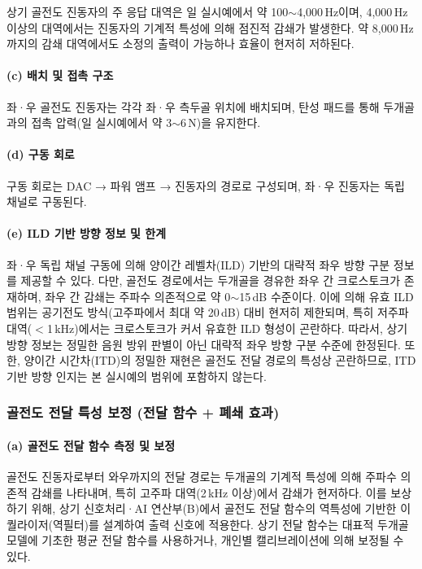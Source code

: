 \documentclass{article}
\begin{document}
상기 골전도 진동자의 주 응답 대역은 일 실시예에서 약 100$\sim$4{,}000\,Hz이며, 4{,}000\,Hz 이상의 대역에서는 진동자의 기계적 특성에 의해 점진적 감쇄가 발생한다. 약 8{,}000\,Hz까지의 감쇄 대역에서도 소정의 출력이 가능하나 효율이 현저히 저하된다.

\paragraph{(c) 배치 및 접촉 구조}

좌·우 골전도 진동자는 각각 좌·우 측두골 위치에 배치되며, 탄성 패드를 통해 두개골과의 접촉 압력(일 실시예에서 약 3$\sim$6\,N)을 유지한다.

\paragraph{(d) 구동 회로}

구동 회로는 DAC → 파워 앰프 → 진동자의 경로로 구성되며, 좌·우 진동자는 독립 채널로 구동된다.

\paragraph{(e) ILD 기반 방향 정보 및 한계}

좌·우 독립 채널 구동에 의해 양이간 레벨차(ILD) 기반의 대략적 좌우 방향 구분 정보를 제공할 수 있다. 다만, 골전도 경로에서는 두개골을 경유한 좌우 간 크로스토크가 존재하며, 좌우 간 감쇄는 주파수 의존적으로 약 0$\sim$15\,dB 수준이다. 이에 의해 유효 ILD 범위는 공기전도 방식(고주파에서 최대 약 20\,dB) 대비 현저히 제한되며, 특히 저주파 대역($<$1\,kHz)에서는 크로스토크가 커서 유효한 ILD 형성이 곤란하다. 따라서, 상기 방향 정보는 정밀한 음원 방위 판별이 아닌 대략적 좌우 방향 구분 수준에 한정된다. 또한, 양이간 시간차(ITD)의 정밀한 재현은 골전도 전달 경로의 특성상 곤란하므로, ITD 기반 방향 인지는 본 실시예의 범위에 포함하지 않는다.

\subsubsection{골전도 전달 특성 보정 (전달 함수 + 폐쇄 효과)}

\paragraph{(a) 골전도 전달 함수 측정 및 보정}

골전도 진동자로부터 와우까지의 전달 경로는 두개골의 기계적 특성에 의해 주파수 의존적 감쇄를 나타내며, 특히 고주파 대역(2\,kHz 이상)에서 감쇄가 현저하다. 이를 보상하기 위해, 상기 신호처리·AI 연산부(B)에서 골전도 전달 함수의 역특성에 기반한 이퀄라이저(역필터)를 설계하여 출력 신호에 적용한다. 상기 전달 함수는 대표적 두개골 모델에 기초한 평균 전달 함수를 사용하거나, 개인별 캘리브레이션에 의해 보정될 수 있다.
\end{document}

